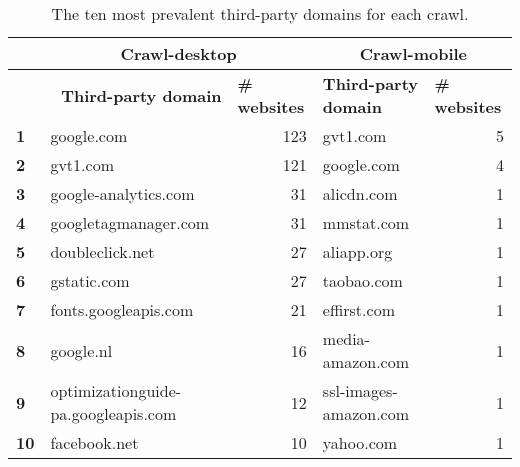 \begin{table}[ht] 
\caption{The ten most prevalent third-party domains for each crawl.} 
\centering 
\begin{tabular}{|l|ll|ll|} 
\hline\textbf{} & \multicolumn{2}{c|}{\textbf{Crawl-desktop}} & \multicolumn{2}{c|}{\textbf{Crawl-mobile}} \\ \hline 
& \multicolumn{1}{r|}{\textbf{Third-party domain}} & \textbf{\# websites} & \multicolumn{1}{l|}{\textbf{Third-party domain}} & \textbf{\# websites} \\ \hline 
\textbf{1} & \multicolumn{1}{l|}{google.com} & \multicolumn{1}{r|}{123} & \multicolumn{1}{l|}{gvt1.com} & \multicolumn{1}{r|}{5} \\ \hline 
\textbf{2} & \multicolumn{1}{l|}{gvt1.com} & \multicolumn{1}{r|}{121} & \multicolumn{1}{l|}{google.com} & \multicolumn{1}{r|}{4} \\ \hline 
\textbf{3} & \multicolumn{1}{l|}{google-analytics.com} & \multicolumn{1}{r|}{31} & \multicolumn{1}{l|}{alicdn.com} & \multicolumn{1}{r|}{1} \\ \hline 
\textbf{4} & \multicolumn{1}{l|}{googletagmanager.com} & \multicolumn{1}{r|}{31} & \multicolumn{1}{l|}{mmstat.com} & \multicolumn{1}{r|}{1} \\ \hline 
\textbf{5} & \multicolumn{1}{l|}{doubleclick.net} & \multicolumn{1}{r|}{27} & \multicolumn{1}{l|}{aliapp.org} & \multicolumn{1}{r|}{1} \\ \hline 
\textbf{6} & \multicolumn{1}{l|}{gstatic.com} & \multicolumn{1}{r|}{27} & \multicolumn{1}{l|}{taobao.com} & \multicolumn{1}{r|}{1} \\ \hline 
\textbf{7} & \multicolumn{1}{l|}{fonts.googleapis.com} & \multicolumn{1}{r|}{21} & \multicolumn{1}{l|}{effirst.com} & \multicolumn{1}{r|}{1} \\ \hline 
\textbf{8} & \multicolumn{1}{l|}{google.nl} & \multicolumn{1}{r|}{16} & \multicolumn{1}{l|}{media-amazon.com} & \multicolumn{1}{r|}{1} \\ \hline 
\textbf{9} & \multicolumn{1}{l|}{optimizationguide-pa.googleapis.com} & \multicolumn{1}{r|}{12} & \multicolumn{1}{l|}{ssl-images-amazon.com} & \multicolumn{1}{r|}{1} \\ \hline 
\textbf{10} & \multicolumn{1}{l|}{facebook.net} & \multicolumn{1}{r|}{10} & \multicolumn{1}{l|}{yahoo.com} & \multicolumn{1}{r|}{1} \\ \hline 
\end{tabular} 
\label{tab:Top10} 
\end{table}